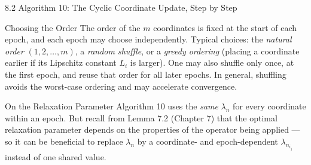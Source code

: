 \documentclass[aspectratio=169,10pt]{beamer}
\begin{document}
\begin{frame}[allowframebreaks]{8.2 Algorithm 10: The Cyclic Coordinate Update, Step by Step}
\begin{alertblock}{Choosing the Order}
The order of the $m$ coordinates is fixed at the start of each epoch, and each epoch may choose independently. Typical choices: the \emph{natural order} $(1,2,\ldots,m)$, a \emph{random shuffle}, or a \emph{greedy ordering} (placing a coordinate earlier if its Lipschitz constant $L_i$ is larger). One may also shuffle only once, at the first epoch, and reuse that order for all later epochs. In general, shuffling avoids the worst-case ordering and may accelerate convergence.
\end{alertblock}

\begin{block}{On the Relaxation Parameter}
Algorithm 10 uses the \emph{same} $\lambda_n$ for every coordinate within an epoch. But recall from Lemma 7.2 (Chapter 7) that the optimal relaxation parameter depends on the properties of the operator being applied --- so it can be beneficial to replace $\lambda_n$ by a coordinate- and epoch-dependent $\lambda_{n_{i_j}}$ instead of one shared value.
\end{block}

\end{frame}
\end{document}

